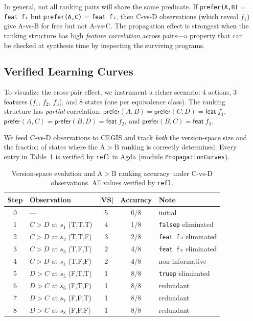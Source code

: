 \begin{remark}
In general, not all ranking pairs will share the same predicate.  If \texttt{prefer(A,B)} = \texttt{feat~f₁} but \texttt{prefer(A,C)} = \texttt{feat~f₂}, then C-vs-D observations (which reveal $f_1$) give A-vs-B for free but not A-vs-C.  The propagation effect is strongest when the ranking structure has high \emph{feature correlation} across pairs---a property that can be checked at synthesis time by inspecting the surviving programs.
\end{remark}

\subsection{Verified Learning Curves}

To visualize the cross-pair effect, we instrument a richer scenario: 4 actions, 3 features ($f_1$, $f_2$, $f_3$), and 8 states (one per equivalence class).  The ranking structure has \emph{partial} correlation: $\mathsf{prefer}(A,B) = \mathsf{prefer}(C,D) = \mathsf{feat}~f_1$, $\mathsf{prefer}(A,C) = \mathsf{prefer}(B,D) = \mathsf{feat}~f_2$, and $\mathsf{prefer}(B,C) = \mathsf{feat}~f_3$.

We feed C-vs-D observations to CEGIS and track \emph{both} the version-space size and the fraction of states where the A$>$B ranking is correctly determined.  Every entry in Table~\ref{tab:curves} is verified by \texttt{refl} in Agda (module \texttt{PropagationCurves}).

\begin{table}[H]
\centering
\caption{Version-space evolution and A$>$B ranking accuracy under C-vs-D observations.  All values verified by \texttt{refl}.}
\label{tab:curves}
\small
\begin{tabular}{@{}clccl@{}}
\textbf{Step} & \textbf{Observation} & $\boldsymbol{|VS|}$ & \textbf{Accuracy} & \textbf{Note} \\
\hline
0 & --- & 5 & 0/8 & initial \\
1 & $C > D$ at $s_1$ {\scriptsize(T,T,T)} & 4 & 1/8 & \texttt{falsep} eliminated \\
2 & $C > D$ at $s_2$ {\scriptsize(T,T,F)} & 3 & 2/8 & \texttt{feat~f₃} eliminated \\
3 & $C > D$ at $s_3$ {\scriptsize(T,F,T)} & 2 & 4/8 & \texttt{feat~f₂} eliminated \\
4 & $C > D$ at $s_4$ {\scriptsize(T,F,F)} & 2 & 4/8 & non-informative \\
5 & $D > C$ at $s_5$ {\scriptsize(F,T,T)} & 1 & 8/8 & \texttt{truep} eliminated \\
6 & $D > C$ at $s_6$ {\scriptsize(F,T,F)} & 1 & 8/8 & redundant \\
7 & $D > C$ at $s_7$ {\scriptsize(F,F,T)} & 1 & 8/8 & redundant \\
8 & $D > C$ at $s_8$ {\scriptsize(F,F,F)} & 1 & 8/8 & redundant \\
\end{tabular}
\end{table}

